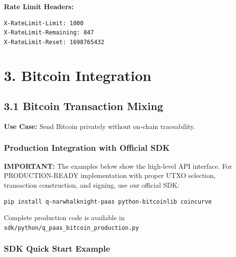 \documentclass[11pt,a4paper]{article}
\begin{document}
\textbf{Rate Limit Headers:}
\begin{lstlisting}[language=bash]
X-RateLimit-Limit: 1000
X-RateLimit-Remaining: 847
X-RateLimit-Reset: 1698765432
\end{lstlisting}

\section{3. Bitcoin Integration}

\subsection{3.1 Bitcoin Transaction Mixing}

\textbf{Use Case:} Send Bitcoin privately without on-chain traceability.

\subsubsection{Production Integration with Official SDK}

\textbf{IMPORTANT:} The examples below show the high-level API interface. For PRODUCTION-READY implementation with proper UTXO selection, transaction construction, and signing, use our official SDK:

\begin{lstlisting}[language=bash]
pip install q-narwhalknight-paas python-bitcoinlib coincurve
\end{lstlisting}

Complete production code is available in \texttt{sdk/python/q\_paas\_bitcoin\_production.py}

\subsubsection{SDK Quick Start Example}
\end{document}

